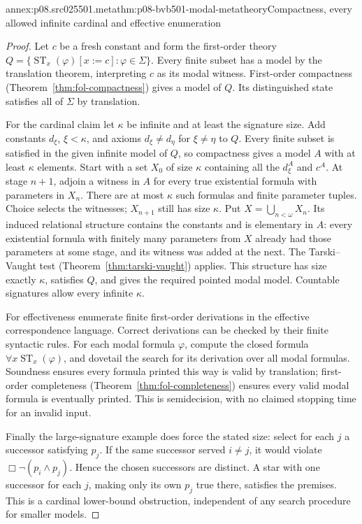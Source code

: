 \begin{annexitem}{annex:p08.src025501.meta}{thm:p08-bvb501-modal-metatheory}{Compactness, every allowed infinite cardinal and effective enumeration}
\begin{proof}
Let \(c\) be a fresh constant and form the first-order theory
\(Q=\{\operatorname{ST}_x(\varphi)[x:=c]:\varphi\in\Sigma\}\).
Every finite subset has a model by the translation theorem, interpreting
\(c\) as its modal witness. First-order compactness
(Theorem~\ref{thm:fol-compactness}) gives a model of \(Q\).
Its distinguished state satisfies all of \(\Sigma\) by translation.

For the cardinal claim let \(\kappa\) be infinite and at least the
signature size. Add constants \(d_\xi\), \(\xi<\kappa\), and
axioms \(d_\xi\ne d_\eta\) for \(\xi\ne\eta\) to \(Q\).
Every finite subset is satisfied in the given infinite model of \(Q\),
so compactness gives a model \(A\) with at least \(\kappa\) elements.
Start with a set \(X_0\) of size \(\kappa\) containing all the
\(d_\xi^A\) and \(c^A\). At stage \(n+1\), adjoin a witness in
\(A\) for every true existential formula with parameters in \(X_n\).
There are at most \(\kappa\) such formulas and finite parameter tuples.
Choice selects the witnesses; \(X_{n+1}\) still has size \(\kappa\).
Put \(X=\bigcup_{n<\omega}X_n\). Its induced relational structure
contains the constants and is elementary in \(A\): every existential
formula with finitely many parameters from \(X\) already had those
parameters at some stage, and its witness was added at the next.
The Tarski--Vaught test
(Theorem~\ref{thm:tarski-vaught}) applies. This structure has size
exactly \(\kappa\), satisfies \(Q\), and gives the required pointed
modal model. Countable signatures allow every infinite \(\kappa\).

For effectiveness enumerate finite first-order derivations in the effective
correspondence language. Correct derivations can be checked by their finite
syntactic rules. For each modal formula \(\varphi\), compute the closed
formula \(\forall x\operatorname{ST}_x(\varphi)\), and dovetail the
search for its derivation over all modal formulas. Soundness ensures every
formula printed this way is valid by translation; first-order completeness
(Theorem~\ref{thm:fol-completeness}) ensures every valid modal formula
is eventually printed. This is semidecision, with no claimed stopping time
for an invalid input.

Finally the large-signature example does force the stated size: select for
each \(j\) a successor satisfying \(p_j\). If the same successor served
\(i\ne j\), it would violate \(\Box\neg(p_i\land p_j)\).
Hence the chosen successors are distinct. A star with one successor for
each \(j\), making only its own \(p_j\) true there, satisfies the
premises. This is a cardinal lower-bound obstruction, independent of any
search procedure for smaller models.
\end{proof}
\end{annexitem}

